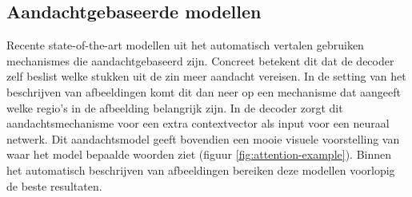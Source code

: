 \subsection{Aandachtgebaseerde modellen}
Recente state-of-the-art modellen uit het automatisch vertalen gebruiken mechanismes die aandachtgebaseerd zijn. Concreet betekent dit dat de decoder zelf beslist welke stukken uit de zin meer aandacht vereisen.
In de setting van het beschrijven van afbeeldingen komt dit dan neer op een mechanisme dat aangeeft welke regio's in de afbeelding belangrijk zijn. In de decoder zorgt dit aandachtsmechanisme voor een extra contextvector als input voor een neuraal netwerk. Dit aandachtsmodel geeft bovendien een mooie visuele voorstelling van waar het model bepaalde woorden ziet (figuur \ref{fig:attention-example}). Binnen het automatisch beschrijven van afbeeldingen bereiken deze modellen  voorlopig de beste resultaten.











